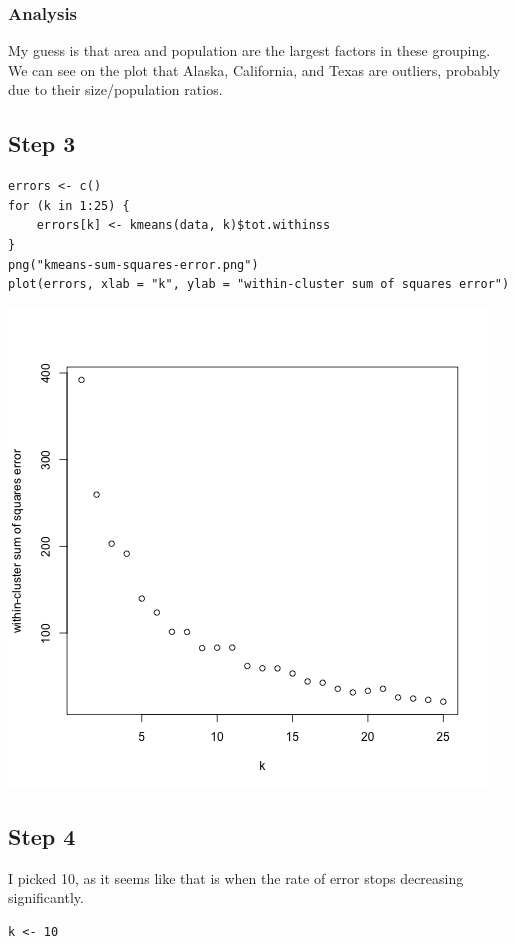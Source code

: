 \documentclass[11pt]{article}
\begin{document}
\subsubsection*{Analysis}
\label{sec:org7b65b29}
My guess is that area and population are the largest factors in these grouping.
We can see on the plot that Alaska, California, and Texas are outliers, probably
due to their size/population ratios. 
\subsection*{Step 3}
\label{sec:orgaf970c1}
\begin{verbatim}
errors <- c()
for (k in 1:25) {
    errors[k] <- kmeans(data, k)$tot.withinss
}
png("kmeans-sum-squares-error.png")
plot(errors, xlab = "k", ylab = "within-cluster sum of squares error")
\end{verbatim}

\begin{center}
\includegraphics[width=.9\linewidth]{kmeans-sum-squares-error.png}
\end{center}

\subsection*{Step 4}
\label{sec:org4439069}
I picked 10, as it seems like that is when the rate of error stops decreasing
significantly. 
\begin{verbatim}
k <- 10
\end{verbatim}
\end{document}
